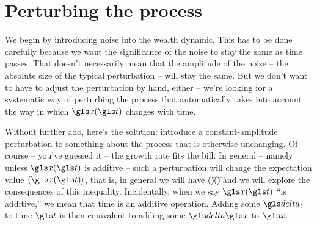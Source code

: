 \section{Perturbing the process }
%
%
%
%
%
%
%
%
%
%
%
%
%

We begin by introducing noise into the wealth dynamic. This has to be done carefully because we want the significance of the noise to stay the same as time passes. That doesn't necessarily mean that the amplitude of the noise -- the absolute size of the typical perturbation -- will stay the same. But we don't want to have to adjust the perturbation by hand, either -- we're looking for a systematic way of perturbing the process that automatically takes into account the way in which $\x(\t)$ changes with time. 


Without further ado, here's the solution: introduce a constant-amplitude perturbation to something about the process that is otherwise unchanging. Of course -- you've guessed it -- the growth rate fits the bill. In general -- namely unless $\x(\t)$ is additive -- such a perturbation will change the expectation value $\ave{\x(\t)}$, that is, in general we will have 
\be
\ave{\x}(\t)\neq \xd(\t)
\ee
and we will explore the consequences of this inequality. Incidentally, when we say $\x(\t)$ ``is additive,'' we mean that time is an additive operation. Adding some $\dt$ to time $\t$ is then equivalent to adding some $\d \x$ to $\x$.

